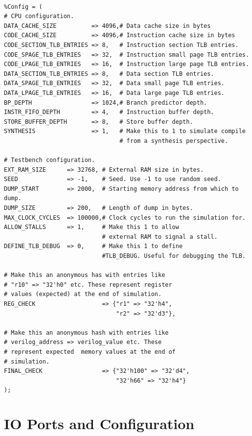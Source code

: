 \documentclass[10pt]{article}
\begin{document}
\begin{lstlisting}[frame=none] % Perl code block start.

%Config = ( 
# CPU configuration.
DATA_CACHE_SIZE          => 4096,# Data cache size in bytes
CODE_CACHE_SIZE          => 4096,# Instruction cache size in bytes
CODE_SECTION_TLB_ENTRIES => 8,   # Instruction section TLB entries.
CODE_SPAGE_TLB_ENTRIES   => 32,  # Instruction small page TLB entries.
CODE_LPAGE_TLB_ENTRIES   => 16,  # Instruction large page TLB entries.
DATA_SECTION_TLB_ENTRIES => 8,   # Data section TLB entries.
DATA_SPAGE_TLB_ENTRIES   => 32,  # Data small page TLB entries.
DATA_LPAGE_TLB_ENTRIES   => 16,  # Data large page TLB entries.
BP_DEPTH                 => 1024,# Branch predictor depth.
INSTR_FIFO_DEPTH         => 4,   # Instruction buffer depth.
STORE_BUFFER_DEPTH       => 8,   # Store buffer depth.
SYNTHESIS                => 1,   # Make this to 1 to simulate compile 
                                 # from a synthesis perspective.

# Testbench configuration.
EXT_RAM_SIZE      => 32768, # External RAM size in bytes.
SEED              => -1,    # Seed. Use -1 to use random seed.
DUMP_START        => 2000,  # Starting memory address from which to dump.
DUMP_SIZE         => 200,   # Length of dump in bytes.
MAX_CLOCK_CYCLES  => 100000,# Clock cycles to run the simulation for.
ALLOW_STALLS      => 1,     # Make this 1 to allow 
                            # external RAM to signal a stall.
DEFINE_TLB_DEBUG  => 0,     # Make this 1 to define 
                            #TLB_DEBUG. Useful for debugging the TLB.

# Make this an anonymous has with entries like 
# "r10" => "32'h0" etc. These represent register 
# values (expected) at the end of simulation.
REG_CHECK                   => {"r1" => "32'h4", 
                                "r2" => "32'd3"},      

# Make this an anonymous hash with entries like 
# verilog_address => verilog_value etc. These 
# represent expected  memory values at the end of 
# simulation.
FINAL_CHECK                 => {"32'h100" => "32'd4", 
                                "32'h66" => "32'h4"}       
);

\end{lstlisting}

\section{IO Ports and Configuration}
\end{document}
